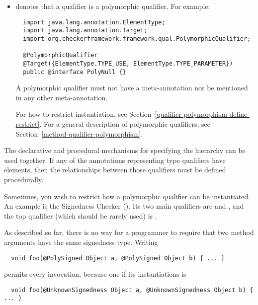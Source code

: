 \begin{itemize}
\item {} denotes that a qualifier is a
  polymorphic qualifier.  For example:

\begin{Verbatim}
  import java.lang.annotation.ElementType;
  import java.lang.annotation.Target;
  import org.checkerframework.framework.qual.PolymorphicQualifier;

  @PolymorphicQualifier
  @Target({ElementType.TYPE_USE, ElementType.TYPE_PARAMETER})
  public @interface PolyNull {}
\end{Verbatim}

  A polymorphic qualifier must not have
  a  meta-annotation nor be
  mentioned in any other 
  meta-annotation.

  For how to restrict instantiation, see Section~\ref{qualifier-polymorphism-define-restrict}.
  For a general description of polymorphic qualifiers, see
  Section~\ref{method-qualifier-polymorphism}.

\end{itemize}

The declarative and procedural mechanisms for specifying the hierarchy can
be used together. If any of the annotations representing type qualifiers have elements, then
the relationships between those qualifiers must be defined procedurally.



Sometimes, you wish to restrict how a polymorphic qualifier can be
instantiated.  An example is the Signedness Checker
().  Its two main qualifiers are
 and
, and the top qualifier
(which should be rarely used) is
.

As described so far, there is no way for a programmer to require that two
method arguments have the same signedness type.  Writing

\begin{Verbatim}
  void foo(@PolySigned Object a, @PolySigned Object b) { ... }
\end{Verbatim}

\noindent
permits every invocation, because one if its instantiations is

\begin{Verbatim}
  void foo(@UnknownSignedness Object a, @UnknownSignedness Object b) { ... }
\end{Verbatim}

